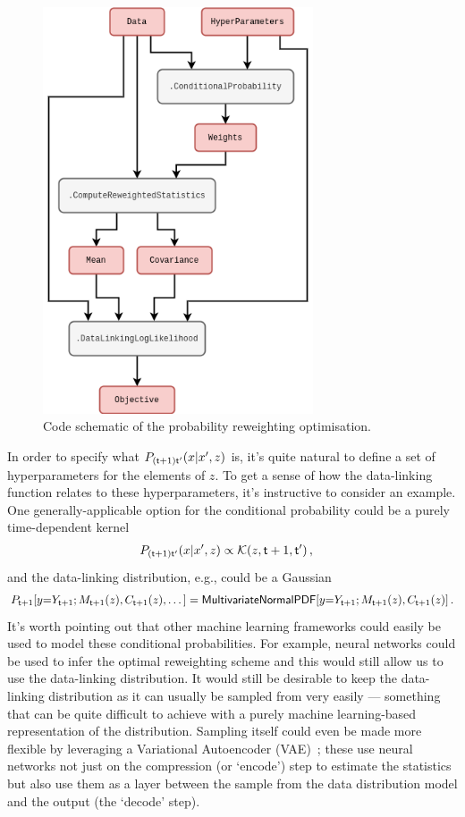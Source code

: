 \begin{figure}[h]
\centering
\includegraphics[width=8cm]{images/chapter-4-prob-reweighting-code.drawio.png}
\caption{Code schematic of the probability reweighting optimisation.}
\label{fig:prob-reweighting-code}
\end{figure} 

In order to specify what $P_{({\sf t}+1){\sf t}'}(x\vert x',z)$ is, it's quite natural to define a set of hyperparameters for the elements of $z$. To get a sense of how the data-linking function relates to these hyperparameters, it's instructive to consider an example. One generally-applicable option for the conditional probability could be a purely time-dependent kernel
\begin{align}
P_{({\sf t}+1){\sf t}'}(x\vert x',z) &\propto {\cal K}(z, {\sf t}+1,{\sf t}')  \label{eq:time-dependent-kernel} \,, 
\end{align}
and the data-linking distribution, e.g., could be a Gaussian
\begin{align}
P_{{\sf t}+1}[y{=}Y_{{\sf t}+1};M_{{\sf t}+1}(z),C_{{\sf t}+1}(z),\dots ] = {\sf MultivariateNormalPDF}[y{=}Y_{{\sf t}+1};M_{{\sf t}+1}(z),C_{{\sf t}+1}(z)] \label{eq:gaussian-data-prob}\,.
\end{align}
It's worth pointing out that other machine learning frameworks could easily be used to model these conditional probabilities. For example, neural networks could be used to infer the optimal reweighting scheme and this would still allow us to use the data-linking distribution. It would still be desirable to keep the data-linking distribution as it can usually be sampled from very easily --- something that can be quite difficult to achieve with a purely machine learning-based representation of the distribution. Sampling itself could even be made more flexible by leveraging a Variational Autoencoder (VAE)~\cite{pinheiro2021variational}; these use neural networks not just on the compression (or `encode') step to estimate the statistics but also use them as a layer between the sample from the data distribution model and the output (the `decode' step). 

